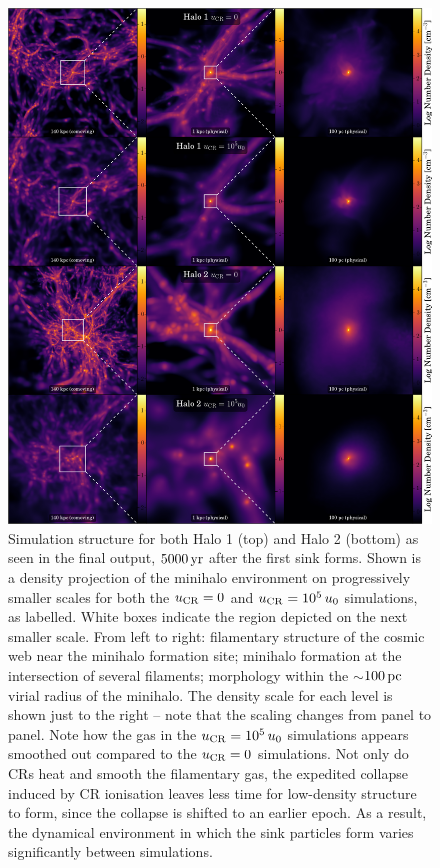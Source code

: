 \documentclass[usenatbib]{mn2e}
\newcommand{\pc}{\,{\rm pc}}
\newcommand{\yr}{\,{\rm yr}}
\newcommand{\ucr}{{u}_{\rm \small CR}}
\begin{document}
\begin{figure}
\begin{center}
\includegraphics[width=.95\textwidth]{figures/structure/structure}
\caption{\label{fig:structure}
Simulation structure for both Halo 1 (top) and Halo 2 (bottom) as seen in the final output, $5000\yr$ after the first sink forms.  
Shown is a density projection of the minihalo environment on progressively smaller scales for both the $\ucr=0$ and $\ucr=10^5\,u_0$ simulations, as labelled.  
White boxes indicate the region depicted on the next smaller scale.  
From left to right: filamentary structure of the cosmic web near the minihalo formation site; minihalo formation at the intersection of several filaments; morphology within the $\sim$$100\pc$ virial radius of the minihalo. 
The density scale for each level is shown just to the right -- note that the scaling changes from panel to panel.
Note how the gas in the $\ucr=10^5\,u_0$ simulations appears smoothed out compared to the $\ucr=0$ simulations.  
Not only do CRs heat and smooth the filamentary gas, the expedited collapse induced by CR ionisation leaves less time for low-density structure to form, since the collapse is shifted to an earlier epoch.  
As a result, the dynamical environment in which the sink particles form varies significantly between simulations.%
}
\end{center}
\end{figure}
\end{document}
